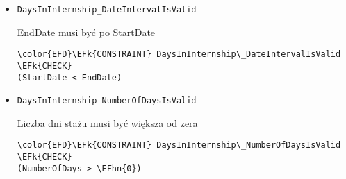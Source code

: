 \documentclass[11pt]{article}
\newcommand{\EFk}[1]{\textcolor{EFk}{\textbf{#1}}} %
\newcommand{\EFhn}[1]{\textcolor{EFhn}{#1}} %
\begin{document}
\begin{itemize}
\item \texttt{DaysInInternship\_DateIntervalIsValid}

EndDate musi być po StartDate
\begin{Code}
\begin{Verbatim}
\color{EFD}\EFk{CONSTRAINT} DaysInInternship\_DateIntervalIsValid \EFk{CHECK}
(StartDate < EndDate)
\end{Verbatim}
\end{Code}
\item \texttt{DaysInInternship\_NumberOfDaysIsValid}

Liczba dni stażu musi być większa od zera
\begin{Code}
\begin{Verbatim}
\color{EFD}\EFk{CONSTRAINT} DaysInInternship\_NumberOfDaysIsValid \EFk{CHECK}
(NumberOfDays > \EFhn{0})
\end{Verbatim}
\end{Code}
\end{itemize}
\end{document}
